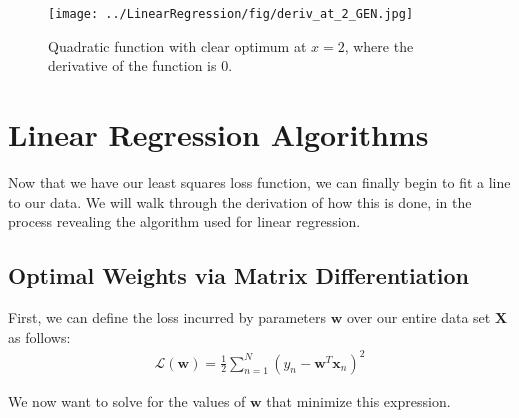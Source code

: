 \begin{figure}
    \centering
    \texttt{[image: ../LinearRegression/fig/deriv\_at\_2\_GEN.jpg]}
    \caption{Quadratic function with clear optimum at $x=2$, where the derivative of the function is 0.}
    \label{fig:quad-deriv-at-2}
\end{figure}

\section{Linear Regression Algorithms}
Now that we have our least squares loss function, we can finally begin to fit a line to our data. We will walk through the derivation of how this is done, in the process revealing the algorithm used for linear regression.

\subsection{Optimal Weights via Matrix Differentiation}
First, we can define the loss incurred by parameters $\textbf{w}$ over our entire data set $\textbf{X}$ as follows:
\begin{align}
    \mathcal{L}(\textbf{w}) = \frac{1}{2} \sum_{n=1}^{N} (y_{n} - \textbf{w}^{T}\textbf{x}_{n})^2
\end{align}


We now want to solve for the values of $\textbf{w}$ that minimize this expression.


